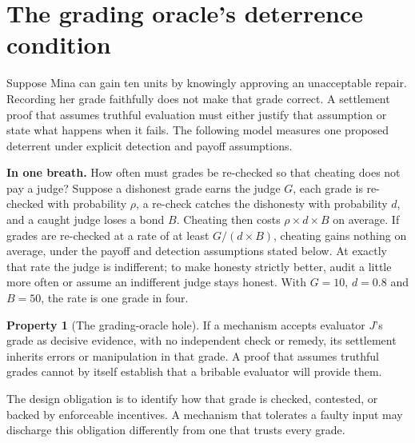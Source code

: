 \documentclass[11pt,a4paper]{article}
\theoremstyle{definition}
\newtheorem{property}{Property}[section]
\begin{document}

\pdexercisepointer{\ref{ex:stp-judge-competence}}{\ref{ex:stp-vector-disclosure}}{\pageref{ex:stp-judge-competence}}


\section{The grading oracle's deterrence condition}\label{sec:oracle}


Suppose Mina can gain ten units by knowingly approving an unacceptable repair.
Recording her grade faithfully does not make that grade correct. A settlement
proof that assumes truthful evaluation must either justify that assumption or
state what happens when it fails. The following model measures one proposed
deterrent under explicit detection and payoff assumptions.

\medskip\noindent\textbf{In one breath.} How often must grades be re-checked
so that cheating does not pay a judge? Suppose a dishonest grade earns the
judge $G$, each grade is re-checked with probability $\rho$, a re-check catches
the dishonesty with probability $d$, and a caught judge loses a bond $B$.
Cheating then costs $\rho\times d\times B$ on average. If grades are re-checked
at a rate of at least $G/(d\times B)$, cheating gains nothing on average, under
the payoff and detection assumptions stated below. At exactly that rate the
judge is indifferent; to make honesty strictly better, audit a little more
often or assume an indifferent judge stays honest. With $G=10$, $d=0.8$ and
$B=50$, the rate is one grade in four.

\begin{property}[The grading-oracle hole]\label{prop:hole}
\setlength{\parskip}{4pt plus 1pt}
If a mechanism accepts evaluator $J$'s grade as decisive evidence, with no independent check or remedy, its settlement inherits errors or manipulation in that grade. A proof that assumes truthful grades cannot by itself establish that a bribable evaluator will provide them.

The design obligation is to identify how that grade is checked, contested, or backed by enforceable incentives. A mechanism that tolerates a faulty input may discharge this obligation differently from one that trusts every grade.
\end{property}
\end{document}
